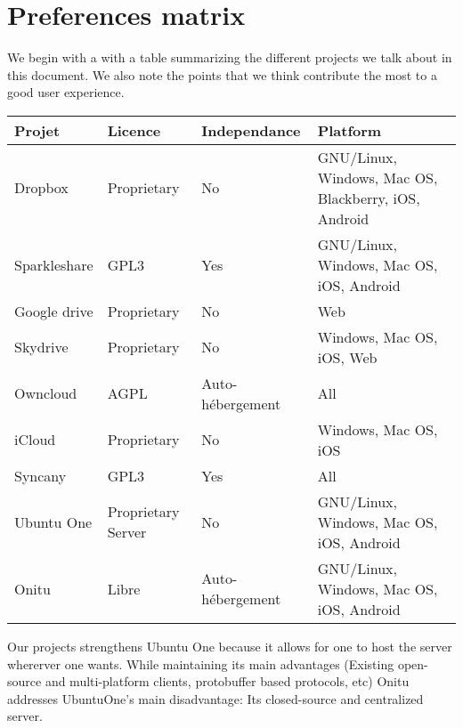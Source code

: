 \section{Preferences matrix}
We begin with a with a table summarizing the different projects we talk about in this document. We also note the points that we think contribute the most to a good user experience.\\

\begin{tabular}{|l|p{4cm}|p{4cm}|p{5cm}|}
\hline
\rowcolor{lightGray}
\rowstyle{ \color{epiBlue} \bfseries}
	Projet & Licence & Independance & Platform \\
\hline
	Dropbox & Proprietary & No & GNU/Linux, Windows, Mac OS, Blackberry, iOS, Android \\
\hline
	Sparkleshare & GPL3 & Yes & GNU/Linux, Windows, Mac OS, iOS, Android \\
\hline
	Google drive & Proprietary & No & Web \\
\hline
	Skydrive & Proprietary & No & Windows, Mac OS, iOS, Web \\
\hline
	Owncloud & AGPL & Auto-hébergement & All \\
\hline
	iCloud & Proprietary & No & Windows, Mac OS, iOS \\
\hline
	Syncany & GPL3 & Yes & All \\
\hline
	Ubuntu One & Proprietary Server & No & GNU/Linux, Windows, Mac OS, iOS, Android \\
\hline
	Onitu & Libre & Auto-hébergement & GNU/Linux, Windows, Mac OS, iOS, Android \\
\hline
\end{tabular}

\vspace*{10mm}

Our projects strengthens Ubuntu One because it allows for one to host the server whererver one wants. While maintaining its main advantages (Existing open-source and multi-platform clients, protobuffer based protocols, etc) Onitu addresses UbuntuOne's main disadvantage: Its closed-source and centralized server.

